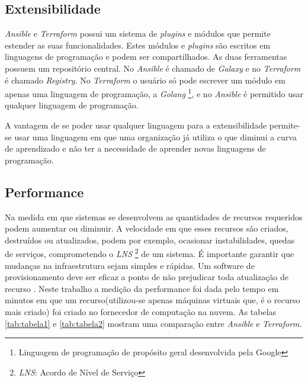 \subsection{Extensibilidade}

\textit{Ansible} e \textit{Terraform} possui um sistema de \textit{plugins} e módulos que permite estender as suas funcionalidades. Estes módulos e \textit{plugins} são escritos em linguagens de programação e podem ser compartilhados. As duas ferramentas possuem um repositório central. No \textit{Ansible} é chamado de \textit{Galaxy} e no \textit{Terraform} é chamado \textit{Registry}. No \textit{Terraform} o usuário só pode escrever um módulo em apenas uma linguagem de programação, a \textit{Golang}  \footnote{Linguagem de programação de propósito geral desenvolvida pela Google}, e no \textit{Ansible} é permitido usar qualquer linguagem de programação.  

A vantagem de se poder usar qualquer linguagem para a extensibilidade permite-se usar uma linguagem em que uma organização já utiliza o que diminui a curva de aprendizado e não ter a necessidade de aprender novas linguagens de programação.  

\subsection{Performance}
Na medida em que sistemas se desenvolvem as quantidades de recursos requeridos podem aumentar ou diminuir. A velocidade em que esses recursos são criados, destruídos ou atualizados, podem por exemplo, ocasionar instabilidades, quedas de serviços, comprometendo o \textit{LNS} \footnote{ \textit{LNS}: Acordo de Nível de Serviço} de um sistema. É importante garantir que mudanças na infraestrutura sejam simples e rápidas. Um software de provisionamento deve ser eficaz a ponto de não prejudicar toda atualização de recurso \cite{sre_google}. Neste trabalho a medição da performance foi dada pelo tempo em minutos em que um recurso(utilizou-se apenas máquinas virtuais que, é o recurso mais criado) foi criado no fornecedor de computação na nuvem. As tabelas \ref{tab:tabela1} e \ref{tab:tabela2} mostram uma comparação entre \textit{Ansible} e \textit{Terraform}. 


